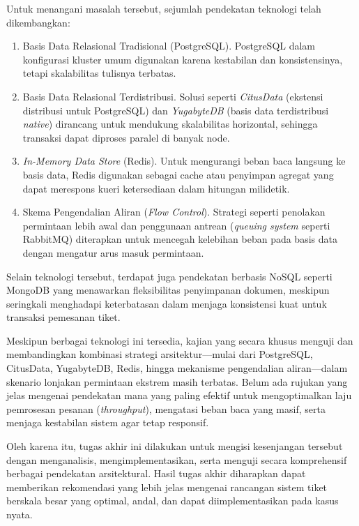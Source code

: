 Untuk menangani masalah tersebut, sejumlah pendekatan teknologi telah dikembangkan:

\begin{enumerate}
    \item Basis Data Relasional Tradisional (PostgreSQL). PostgreSQL dalam konfigurasi kluster umum digunakan karena kestabilan dan konsistensinya, tetapi skalabilitas tulisnya terbatas.
    \item Basis Data Relasional Terdistribusi. Solusi seperti \textit{CitusData} (ekstensi distribusi untuk PostgreSQL) dan \textit{YugabyteDB} (basis data terdistribusi \textit{native}) dirancang untuk mendukung skalabilitas horizontal, sehingga transaksi dapat diproses paralel di banyak node.
    \item \textit{In-Memory Data Store} (Redis). Untuk mengurangi beban baca langsung ke basis data, Redis digunakan sebagai cache atau penyimpan agregat yang dapat merespons kueri ketersediaan dalam hitungan milidetik.
    \item Skema Pengendalian Aliran (\textit{Flow Control}). Strategi seperti penolakan permintaan lebih awal dan penggunaan antrean (\textit{queuing system} seperti RabbitMQ) diterapkan untuk mencegah kelebihan beban pada basis data dengan mengatur arus masuk permintaan.
\end{enumerate}

Selain teknologi tersebut, terdapat juga pendekatan berbasis NoSQL seperti MongoDB yang menawarkan fleksibilitas penyimpanan dokumen, meskipun seringkali menghadapi keterbatasan dalam menjaga konsistensi kuat untuk transaksi pemesanan tiket.

Meskipun berbagai teknologi ini tersedia, kajian yang secara khusus menguji dan membandingkan kombinasi strategi arsitektur—mulai dari PostgreSQL, CitusData, YugabyteDB, Redis, hingga mekanisme pengendalian aliran—dalam skenario lonjakan permintaan ekstrem masih terbatas. Belum ada rujukan yang jelas mengenai pendekatan mana yang paling efektif untuk mengoptimalkan laju pemrosesan pesanan (\textit{throughput}), mengatasi beban baca yang masif, serta menjaga kestabilan sistem agar tetap responsif.

Oleh karena itu, tugas akhir ini dilakukan untuk mengisi kesenjangan tersebut dengan menganalisis, mengimplementasikan, serta menguji secara komprehensif berbagai pendekatan arsitektural. Hasil tugas akhir diharapkan dapat memberikan rekomendasi yang lebih jelas mengenai rancangan sistem tiket berskala besar yang optimal, andal, dan dapat diimplementasikan pada kasus nyata.
